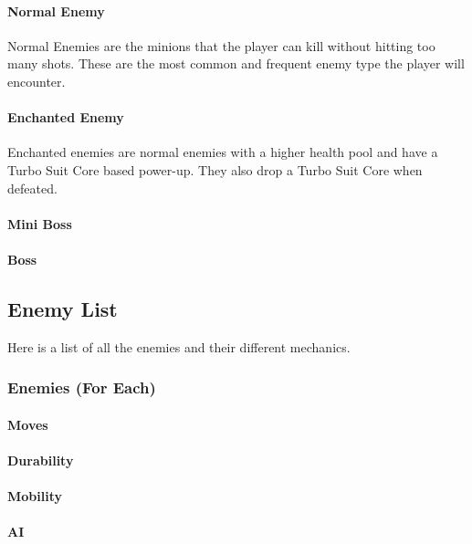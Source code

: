 \documentclass[12pt]{article}
\begin{document}
\paragraph{Normal Enemy}

Normal Enemies are the minions that the player can kill without hitting too many shots. These are the most common and frequent enemy type the player will encounter. 

\paragraph{Enchanted Enemy}

Enchanted enemies are normal enemies with a higher health pool and have a Turbo Suit Core based power-up. They also drop a Turbo Suit Core when defeated. 

\paragraph{Mini Boss}

\paragraph{Boss}
\subsection{Enemy List}

Here is a list of all the enemies and their different mechanics. 

\subsubsection{Enemies (For Each)}

\paragraph{Moves}

\paragraph{Durability}

\paragraph{Mobility}

\paragraph{AI}
\end{document}
